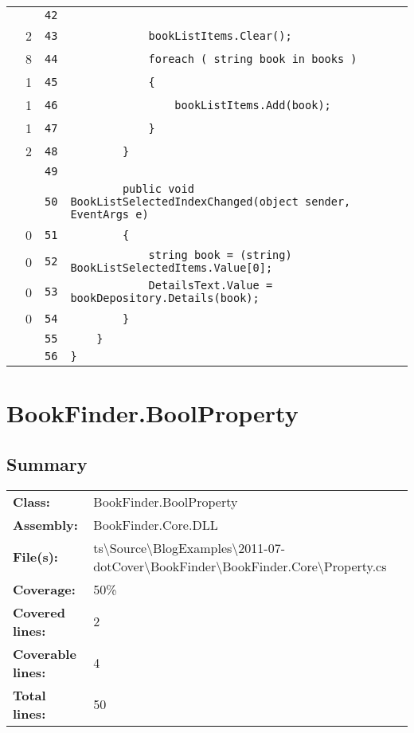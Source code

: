 \documentclass[a4paper,10pt]{article}
\begin{document}
\begin{longtable}[l]{lrrl}
\cellcolor{gray} &  & \verb~42~ & \verb~~\\
\cellcolor{green} & 2 & \verb~43~ & \verb~            bookListItems.Clear();~\\
\cellcolor{green} & 8 & \verb~44~ & \verb~            foreach ( string book in books )~\\
\cellcolor{green} & 1 & \verb~45~ & \verb~            {~\\
\cellcolor{green} & 1 & \verb~46~ & \verb~                bookListItems.Add(book);~\\
\cellcolor{green} & 1 & \verb~47~ & \verb~            }~\\
\cellcolor{green} & 2 & \verb~48~ & \verb~        }~\\
\cellcolor{gray} &  & \verb~49~ & \verb~~\\
\cellcolor{gray} &  & \verb~50~ & \verb~        public void BookListSelectedIndexChanged(object sender, EventArgs e)~\\
\cellcolor{red} & 0 & \verb~51~ & \verb~        {~\\
\cellcolor{red} & 0 & \verb~52~ & \verb~            string book = (string) BookListSelectedItems.Value[0];~\\
\cellcolor{red} & 0 & \verb~53~ & \verb~            DetailsText.Value = bookDepository.Details(book);~\\
\cellcolor{red} & 0 & \verb~54~ & \verb~        }~\\
\cellcolor{gray} &  & \verb~55~ & \verb~    }~\\
\cellcolor{gray} &  & \verb~56~ & \verb~}~\\
\end{longtable}
\newpage
\section{BookFinder.BoolProperty}
\subsection{Summary}
\begin{longtable}[l]{ll}
\textbf{Class:} & BookFinder.BoolProperty\\
\textbf{Assembly:} & BookFinder.Core.DLL\\
\textbf{File(s):} & \begin{minipage}[t]{12cm}{ts\textbackslash Source\textbackslash BlogExamples\textbackslash 2011-07-dotCover\textbackslash BookFinder\textbackslash BookFinder.Core\textbackslash Property.cs}\end{minipage} \\
\textbf{Coverage:} & 50\%\\
\textbf{Covered lines:} & 2\\
\textbf{Coverable lines:} & 4\\
\textbf{Total lines:} & 50\\
\end{longtable}
\end{document}

